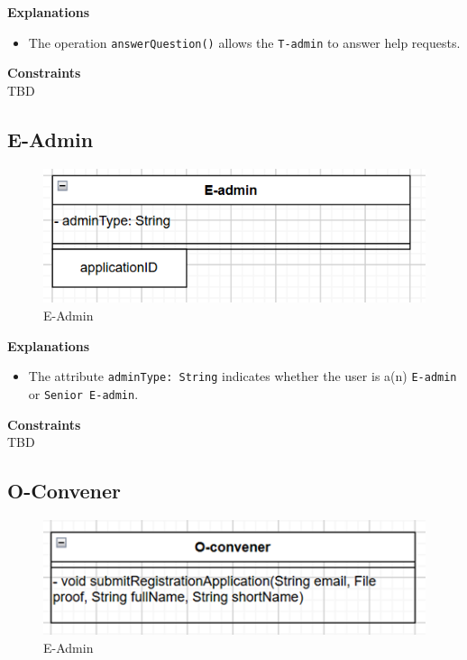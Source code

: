 \textbf{Explanations}
\begin{itemize}
    \item The operation \texttt{answerQuestion()} allows the \texttt{T-admin} to answer help requests.
\end{itemize}

\textbf{Constraints} \\
TBD

\subsection{E-Admin}
\begin{figure}[H]
    \centering
    \includegraphics[width=0.7\linewidth]{picture/3-2/3-2-3.png}
    \caption{E-Admin}
    \label{fig:enter-label}
\end{figure}

\textbf{Explanations}
\begin{itemize}
    \item The attribute \texttt{adminType: String} indicates whether the user is a(n) \texttt{E-admin} or \texttt{Senior E-admin}.
\end{itemize}

\textbf{Constraints} \\
TBD

\subsection{O-Convener}
\begin{figure}[H]
    \centering
    \includegraphics[width=0.7\linewidth]{picture/3-2/3-2-4.png}
    \caption{E-Admin}
    \label{fig:enter-label}
\end{figure}


